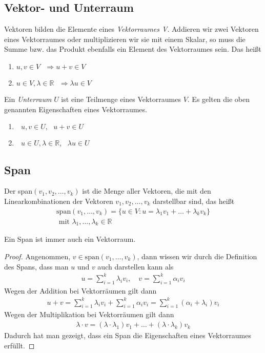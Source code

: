 \subsection{Vektor- und Unterraum}
Vektoren bilden die Elemente eines \textit{Vektorraumes V}. Addieren wir zwei Vektoren eines Vektorraumes oder multiplizieren wir sie mit einem Skalar, so muss die Summe bzw. das Produkt ebenfalls ein Element des Vektorraumes sein. Das hei\ss t
\begin{enumerate}
\item $u, v \in V \text{ }\Rightarrow u+v \in V$
\item $u\in V, \lambda \in \mathbb{R} \text{ }\Rightarrow \lambda u \in V$
\end{enumerate}
\vspace{10pt}
Ein \textit{Unterraum} $U$ ist eine Teilmenge eines Vektorraumes $V$. Es gelten die oben genannten Eigenschaften eines Vektorraumes.
\begin{enumerate}
\item $\text{ }u, v \in U,\text{ } u+v \in U$
\item $\text{ }u \in U, \lambda \in \mathbb{R} ,\text{ }\lambda u \in U$
\end{enumerate}



\subsection{Span}
Der span$(v_1, v_2,\dots,v_k)$ ist die Menge aller Vektoren, die mit den Linearkombinationen der Vektoren $v_1, v_2, \dots, v_k$ darstellbar sind, das hei\ss t
\begin{align*}
\text{span}(v_1,\dots,v_k) = \{u \in V : u = \lambda_1v_1+\dots+\lambda_kv_k\} \\
\text{ mit } \lambda_1,\dots,\lambda_k \in \mathbb{R}
\end{align*}



\begin{theorem}
Ein Span ist immer auch ein Vektorraum.
\end{theorem}
\begin{proof} 
Angenommen, $v \in \text{span}(v_1,\dots,v_k)$,
dann wissen wir durch die Definition des Spans, dass man $u$ und $v$ auch darstellen kann als
\begin{align*}
u = \sum\limits_{i=1}^{k} \lambda_iv_i, \quad v = \sum\limits_{i=1}^{k} \alpha_iv_i
\end{align*}
Wegen der Addition bei Vektorr\"aumen gilt dann
\begin{align*}
	u + v = \sum\limits_{i=1}^{k} \lambda_iv_i + \sum\limits_{i=1}^{k} \alpha_iv_i= \sum\limits_{i=1}^{k} (\alpha_i+\lambda_i)v_i
\end{align*}
Wegen der Multiplikation bei Vektorr\"aumen gilt dann
\begin{align*}
	\lambda\cdot v = (\lambda \cdot \lambda_1) v_1+\dots+(\lambda \cdot \lambda_k)v_k
\end{align*}
Dadurch hat man gezeigt, dass ein Span die Eigenschaften eines Vektorraumes erf\"ullt.
\end{proof}



